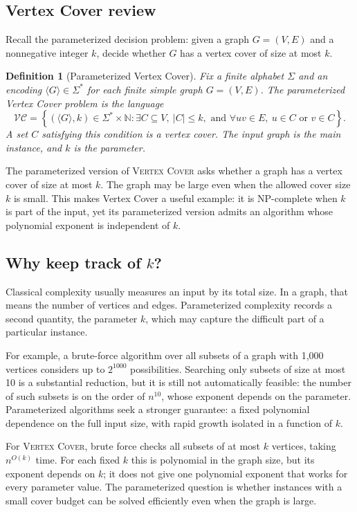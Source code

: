 \documentclass[11pt]{article}
\newtheorem{definition}[theorem]{Definition}
\newcommand{\VC}{\textsc{Vertex Cover}}
\begin{document}
\subsection{Vertex Cover review}

Recall the parameterized decision problem: given a graph $G=(V,E)$ and a nonnegative integer $k$, decide whether $G$ has a vertex cover of size at most $k$.

\begin{definition}[Parameterized Vertex Cover]
Fix a finite alphabet $\Sigma$ and an encoding $\langle G\rangle\in\Sigma^*$ for each finite simple graph $G=(V,E)$. The parameterized Vertex Cover problem is the language
\[
\mathcal{VC}=\left\{(\langle G\rangle,k)\in\Sigma^*\times\mathbb{N}:\exists C\subseteq V,\ |C|\leq k,\text{ and }\forall uv\in E,\ u\in C\text{ or }v\in C\right\}.
\]
A set $C$ satisfying this condition is a vertex cover. The input graph is the main instance, and $k$ is the parameter.
\end{definition}

The parameterized version of \VC{} asks whether a graph has a vertex cover of size at most $k$. The graph may be large even when the allowed cover size $k$ is small. This makes Vertex Cover a useful example: it is NP-complete when $k$ is part of the input, yet its parameterized version admits an algorithm whose polynomial exponent is independent of $k$.

\subsection{Why keep track of $k$?}

Classical complexity usually measures an input by its total size. In a graph, that means the number of vertices and edges. Parameterized complexity records a second quantity, the parameter $k$, which may capture the difficult part of a particular instance.

For example, a brute-force algorithm over all subsets of a graph with 1,000 vertices considers up to $2^{1000}$ possibilities. Searching only subsets of size at most 10 is a substantial reduction, but it is still not automatically feasible: the number of such subsets is on the order of $n^{10}$, whose exponent depends on the parameter. Parameterized algorithms seek a stronger guarantee: a fixed polynomial dependence on the full input size, with rapid growth isolated in a function of $k$.

For \VC{}, brute force checks all subsets of at most $k$ vertices, taking $n^{O(k)}$ time. For each fixed $k$ this is polynomial in the graph size, but its exponent depends on $k$; it does not give one polynomial exponent that works for every parameter value. The parameterized question is whether instances with a small cover budget can be solved efficiently even when the graph is large.
\end{document}
